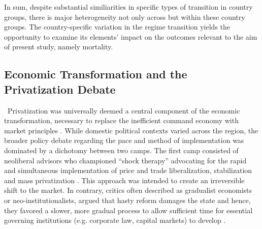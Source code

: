 \documentclass[en,magisterska]{pracamgr}
\begin{document}
In sum, despite substantial similiarities in specific types of transition in country groups, there is major heterogeneity not only across but within these country groups. The country-specific variation in the regime transition yields the opportunity to examine its elements' impact on the outcomes relevant to the aim of present study, namely mortality.


\subsection{Economic Transformation and the Privatization Debate}\
Privatization was universally deemed a central component of the economic transformation, necessary to replace the inefficient command economy with market principles \citep{Estrin1994, Berg1992}. 
While domestic political contexts varied across the region, the broader policy debate regarding the pace and method of implementation was dominated by a dichotomy between two camps. The first camp 
consisted of neoliberal advisors who championed ``shock therapy'' advocating for the rapid and simultaneous implementation of price and trade liberalization, stabilization and mass privatization 
\citep{Hamm2012}. This approach was intended to create an irreversible shift to the market. In contrary, critics often described as gradualist economists or neo-institutionalists, argued that hasty 
reform damages the state and hence, they favored a slower, more gradual process to allow sufficient time for essential governing institutions (e.g. corporate law, capital markets) to develop \citep{Rohac2016, Stuckler2009}.
\end{document}
